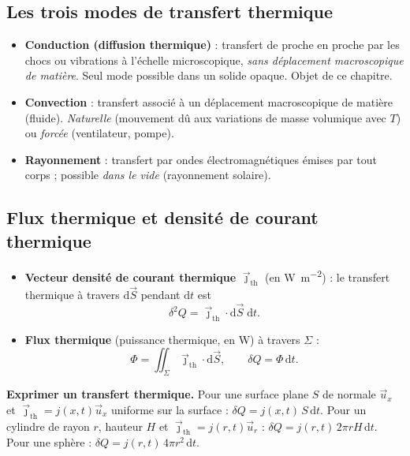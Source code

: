 \documentclass[11pt,a4paper]{article}
\newcommand{\jth}{\vec{\jmath}_{\mathrm{th}}}
\newcommand{\dd}{\mathrm{d}}
\newcommand{\ux}{\vec{u}_x}
\newcommand{\ur}{\vec{u}_r}
\begin{document}
\subsection{Les trois modes de transfert thermique}

\begin{formule}[title={Trois modes de transfert}]
\begin{itemize}[leftmargin=1.5em]
  \item \textbf{Conduction (diffusion thermique)} : transfert de proche en proche par les
        chocs ou vibrations à l'échelle microscopique, \emph{sans déplacement macroscopique de
        matière}. Seul mode possible dans un solide opaque. Objet de ce chapitre.
  \item \textbf{Convection} : transfert associé à un déplacement macroscopique de matière
        (fluide). \emph{Naturelle} (mouvement dû aux variations de masse volumique avec $T$)
        ou \emph{forcée} (ventilateur, pompe).
  \item \textbf{Rayonnement} : transfert par ondes électromagnétiques émises par tout corps
        ; possible \emph{dans le vide} (rayonnement solaire).
\end{itemize}
\end{formule}

\subsection{Flux thermique et densité de courant thermique}

\begin{formule}[title={Définitions}]
\begin{itemize}[leftmargin=1.5em]
  \item \textbf{Vecteur densité de courant thermique} $\jth$ (en \si{\watt\per\square\metre})
        : le transfert thermique à travers $\dd\vec S$ pendant $\dd t$ est
        \[ \delta^2Q=\jth\cdot\dd\vec S\;\dd t. \]
  \item \textbf{Flux thermique} (puissance thermique, en \si{\watt}) à travers $\Sigma$ :
        \[ \Phi=\iint_\Sigma\jth\cdot\dd\vec S,\qquad \delta Q=\Phi\,\dd t. \]
\end{itemize}
\end{formule}

\textbf{Exprimer un transfert thermique.} Pour une surface plane $S$ de normale $\ux$ et
$\jth=j(x,t)\ux$ uniforme sur la surface : $\delta Q=j(x,t)\,S\,\dd t$. Pour un cylindre de
rayon $r$, hauteur $H$ et $\jth=j(r,t)\ur$ : $\delta Q=j(r,t)\,2\pi rH\,\dd t$. Pour une
sphère : $\delta Q=j(r,t)\,4\pi r^2\,\dd t$.
\end{document}
